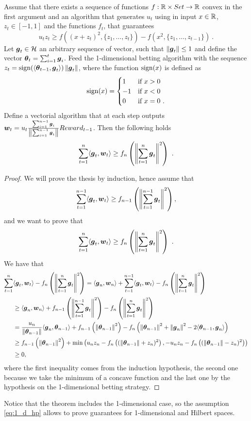\begin{theorem}
Assume that there exists a sequence of functions $f:\mathbb{R} \times Set \rightarrow \mathbb{R}$ convex in the first argument and an algorithm that generates $u_t$ using in input $x \in \mathbb{R}$, $z_t \in [-1,1]$ and the functions $f_t$, that guarantees
\begin{equation}
\label{eq:1_d_hp}
u_t z_t \geq f( (x+z_t)^2, \{z_1, \ldots, z_t\})-f( x^2, \{z_1, \ldots, z_{t-1}\} )~.
\end{equation}
Let $\boldsymbol{g}_t \in \mathcal{H}$ an arbitrary sequence of vector, such that $\left\|{\boldsymbol{g}_t}\right\| \leq 1$ and define the vector ${\boldsymbol{\theta}}_t=\sum_{i=1}^{t} \boldsymbol{g}_i$.
Feed the 1-dimensional betting algorithm with the sequence $z_t= {\rm sign}(\langle {\boldsymbol{\theta}}_{t-1}, \boldsymbol{g}_t \rangle) \left\|{\boldsymbol{g}_t}\right\|$, where the function ${\rm sign}(x)$ is defined as 
\[
{\rm sign}(x) =
\begin{cases}
1 & \mbox{if } x > 0 \\
-1 & \mbox{if } x < 0 \\
0 & \mbox{if } x = 0~.
\end{cases}
\]
Define a vectorial algorithm that at each step outputs $\boldsymbol{w}_t = u_t \frac{\sum_{i=1}^{n-1}\boldsymbol{g}_i}{\left\|{\sum_{i=1}^{n-1}\boldsymbol{g}_i}\right\|}Reward_{t-1}$. Then the following holds
\[
\sum_{t=1}^n \langle \boldsymbol{g}_t, \boldsymbol{w}_t \rangle \geq f_n\left( \left\|{\sum_{t=1}^n \boldsymbol{g}_t}\right\|^2\right)~.
\]
\end{theorem}
\begin{proof}
We will prove the thesis by induction, hence assume that 
\[
\sum_{t=1}^{n-1} \langle \boldsymbol{g}_t, \boldsymbol{w}_t \rangle \geq f_{n-1}\left( \left\|{\sum_{t=1}^{n-1} \boldsymbol{g}_t}\right\|^2\right),
\]
and we want to prove that 
\[
\sum_{t=1}^{n} \langle \boldsymbol{g}_t, \boldsymbol{w}_t \rangle \geq f_{n}\left( \left\|{\sum_{t=1}^{n} \boldsymbol{g}_t}\right\|^2\right)~.
\]
We have that
\begin{align*}
\sum_{t=1}^{n} &\langle \boldsymbol{g}_t, \boldsymbol{w}_t \rangle - f_n\left( \left\|{\sum_{t=1}^{n} \boldsymbol{g}_t}\right\|^2\right)
= \langle \boldsymbol{g}_n, \boldsymbol{w}_n \rangle + \sum_{t=1}^{n-1} \langle \boldsymbol{g}_t, \boldsymbol{w}_t \rangle - f_n\left( \left\|{\sum_{t=1}^{n} \boldsymbol{g}_t}\right\|^2\right)\\
&\geq \langle \boldsymbol{g}_n, \boldsymbol{w}_n \rangle + f_{n-1}\left( \left\|{\sum_{t=1}^{n-1} \boldsymbol{g}_t}\right\|^2\right) - f_n\left( \left\|{\sum_{t=1}^{n} \boldsymbol{g}_t}\right\|^2\right)\\
&= \frac{u_n}{\left\|{{\boldsymbol{\theta}}_{n-1}}\right\|} \langle \boldsymbol{g}_n, {\boldsymbol{\theta}}_{n-1} \rangle + f_{n-1}\left( \left\|{{\boldsymbol{\theta}}_{n-1}}\right\|^2\right) - f_n\left( \left\|{{\boldsymbol{\theta}}_{n-1}}\right\|^2 + \left\|{\boldsymbol{g}_n}\right\|^2 - 2 \langle {\boldsymbol{\theta}}_{n-1}, \boldsymbol{g}_n \rangle \right)\\
&\geq f_{n-1}\left( \left\|{{\boldsymbol{\theta}}_{n-1}}\right\|^2\right)+ \min\left(u_n z_n  - f_n\left( (\left\|{{\boldsymbol{\theta}}_{n-1}}\right\| + z_n)^2 \right), -u_n z_n  - f_n\left( (\left\|{{\boldsymbol{\theta}}_{n-1}}\right\| - z_n)^2 \right)\right)\\
&\geq 0,
\end{align*}
where the first inequality comes from the induction hypothesis, the second one because we take the minimum of a concave function and the last one by the hypothesis on the 1-dimensional betting strategy.
\end{proof}
Notice that the theorem includes the 1-dimensional case, so the assumption \eqref{eq:1_d_hp} allows to prove guarantees for 1-dimensional and Hilbert spaces.

